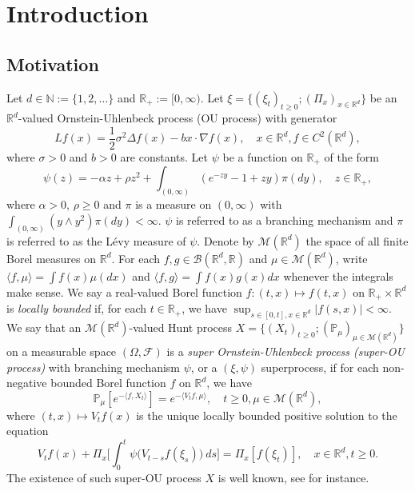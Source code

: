 \documentclass[12pt,a4paper]{amsart}
\theoremstyle{plain}
\theoremstyle{definition}
\numberwithin{equation}{section}
\begin{document}
\section{Introduction}
\subsection{Motivation}
\label{sec: Motivation}
	Let $d \in \mathbb N:= \{1,2,\dots\}$ and $\mathbb R_+:= [0,\infty)$.
    Let $\xi=\{(\xi_t)_{t\geq 0}; (\Pi_x)_{x\in \mathbb R^d}\}$ be an $\mathbb R^d$-valued Ornstein-Uhlenbeck process (OU process) with generator
\begin{equation}
    Lf(x)
    = \frac{1}{2}\sigma^2\Delta f(x)-b x \cdot \nabla f(x),
    \quad  x\in \mathbb R^d, f \in C^2(\mathbb R^d),
\end{equation}
    where $\sigma > 0$ and $b > 0$ are constants.
 Let $\psi$ be a function on $\mathbb R_+$ of the form 
\begin{equation} \label{eq: honogeneou branching mechanism}
    \psi(z)=
    - \alpha z + \rho z^2 + \int_{(0,\infty)} (e^{-zy} - 1 + zy) \pi(dy),
    \quad  z \in \mathbb R_+,
\end{equation}
	where $\alpha > 0 $, $\rho \geq0$ and $\pi$ is a measure on $(0,\infty)$ with $\int_{(0,\infty)}(y\wedge y^2) \pi(dy)< \infty$.
$\psi$ is referred to as a branching mechanism and $\pi$ is referred to as the L\'evy measure
of $\psi$.
    Denote by $\mathcal M(\mathbb R^d)$ the space of all finite Borel measures on $\mathbb R^d$.
    For each $f,g\in \mathcal B(\mathbb R^d, \mathbb R)$ and $\mu \in \mathcal M(\mathbb R^d)$, write $\langle f,\mu\rangle = \int f(x)\mu(dx)$ and $\langle f, g\rangle = \int f(x)g(x) dx$ whenever the integrals make sense.
    We say a real-valued Borel function $f:(t,x)\mapsto f(t,x)$ on $\mathbb R_+\times \mathbb R^d$ is \emph{locally bounded} if, for each $t\in \mathbb R_+$, we have
$
    \sup_{s\in [0,t],x\in \mathbb R^d} |f(s,x)|<\infty.
$
       We say that an $\mathcal M(\mathbb R^d)$-valued Hunt process $X = \{(X_t)_{t\geq 0}; (\mathbb{P}_{\mu})_{\mu \in \mathcal M(\mathbb R^d)}\}$
on a measurable space $(\Omega, \mathcal{F})$
       is a \emph{super Ornstein-Uhlenbeck process (super-OU process)} with branching mechanism $\psi$, 
     or a $(\xi, \psi)$ superprocess,  
       if for each non-negative bounded Borel function $f$ on $\mathbb R^d$, we have
\begin{equation}
\label{eq: def of V_t}
    \mathbb{P}_{\mu}[e^{-\langle f,X_t \rangle}]
    = e^{-\langle V_tf, \mu \rangle},
    \quad t\geq 0, \mu \in \mathcal M(\mathbb R^d),
\end{equation}
	where $(t,x) \mapsto V_tf(x)$ is the unique locally bounded positive solution to the equation
\begin{equation}
	    V_tf(x) + \Pi_x \Big[ \int_0^t\psi\big(V_{t-s}f(\xi_s)\big)~ds\Big]
	= \Pi_x [f(\xi_t)],
    \quad x\in \mathbb R^d, t\geq 0.
\end{equation}	
    The existence of such super-OU process $X$ is well known, see \cite{Dynkin1993Superprocesses} for instance.
\end{document}
